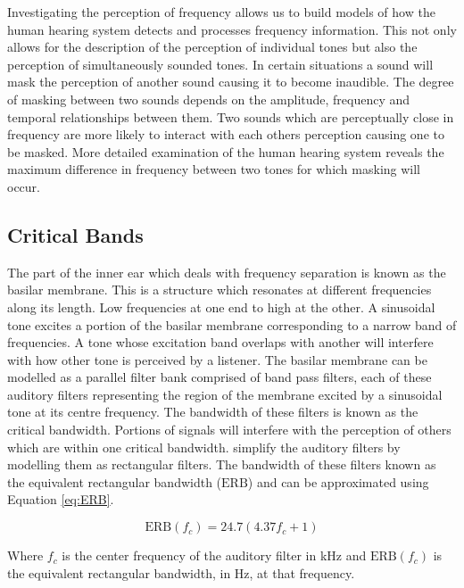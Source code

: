 		Investigating the perception of frequency allows us to build models of how the human hearing system detects
		and processes frequency information. This not only allows for the description of the perception of
		individual tones but also the perception of simultaneously sounded tones. In certain situations a sound
		will mask the perception of another sound causing it to become inaudible. The degree of masking between two
		sounds depends on the amplitude, frequency and temporal relationships between them. Two sounds which are
		perceptually close in frequency are more likely to interact with each others perception causing one to be
		masked. More detailed examination of the human hearing system reveals the maximum difference in frequency
		between two tones for which masking will occur.

	\subsection{Critical Bands}
	\label{sec:Timbre-PsychoacousticPrinciples-CriticalBands}
		The part of the inner ear which deals with frequency separation is known as the basilar membrane. This is a
		structure which resonates at different frequencies along its length. Low frequencies at one end to high at
		the other. A sinusoidal tone excites a portion of the basilar membrane corresponding to a narrow band of
		frequencies. A tone whose excitation band overlaps with another will interfere with how other tone is
		perceived by a listener. The basilar membrane can be modelled as a parallel filter bank comprised of band
		pass filters, each of these auditory filters representing the region of the membrane excited by a
		sinusoidal tone at its centre frequency. The bandwidth of these filters is known as the critical bandwidth.
		Portions of signals will interfere with the perception of others which are within one critical bandwidth.
		\citet{glasberg1990derivation} simplify the auditory filters by modelling them as rectangular filters. The
		bandwidth of these filters known as the equivalent rectangular bandwidth ($\textrm{ERB}$) and can be
		approximated using Equation \ref{eq:ERB}.

		\begin{equation}
			\textrm{ERB}(f_{c}) = 24.7(4.37f_{c} + 1)
			\label{eq:ERB}
		\end{equation}

		Where $f_{c}$ is the center frequency of the auditory filter in kHz and $\textrm{ERB}(f_{c})$ is the
		equivalent rectangular bandwidth, in Hz, at that frequency.

